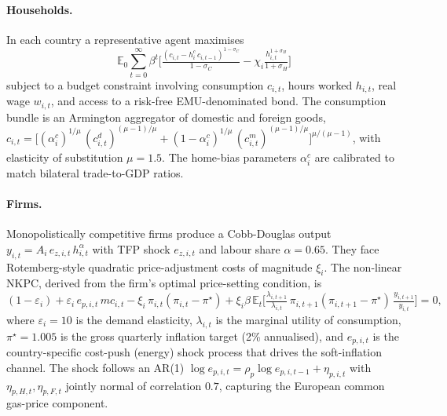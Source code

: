 \documentclass[11pt,a4paper]{article}
\begin{document}
\paragraph{Households.}
In each country a representative agent maximises
\begin{equation}
\mathbb{E}_0 \sum_{t=0}^{\infty} \beta^t
\Big[ \tfrac{(c_{i,t}-h^c_i\, c_{i,t-1})^{1-\sigma_C}}{1-\sigma_C}
- \chi_i \tfrac{h_{i,t}^{1+\sigma_H}}{1+\sigma_H} \Big]
\label{eq:utility}
\end{equation}
subject to a budget constraint involving consumption $c_{i,t}$,
hours worked $h_{i,t}$, real wage $w_{i,t}$, and access to a
risk-free EMU-denominated bond. The consumption bundle is an
Armington aggregator of domestic and foreign goods,
$c_{i,t} = \big[ (\alpha^c_i)^{1/\mu}\, (c^d_{i,t})^{(\mu-1)/\mu} +
(1-\alpha^c_i)^{1/\mu}\, (c^m_{i,t})^{(\mu-1)/\mu} \big]^{\mu/(\mu-1)}$,
with elasticity of substitution $\mu = 1.5$. The home-bias parameters
$\alpha^c_i$ are calibrated to match bilateral trade-to-GDP ratios.

\paragraph{Firms.}
Monopolistically competitive firms produce a Cobb-Douglas output
$y_{i,t} = A_i\, e_{z,i,t}\, h_{i,t}^{\alpha}$ with TFP shock
$e_{z,i,t}$ and labour share $\alpha = 0.65$. They face Rotemberg-style
\citep{Rotemberg1982} quadratic price-adjustment costs of magnitude
$\xi_i$. The non-linear NKPC, derived from the firm's optimal
price-setting condition, is
\begin{equation}
(1-\varepsilon_i) + \varepsilon_i\, e_{p,i,t}\,mc_{i,t}
- \xi_i\, \pi_{i,t}(\pi_{i,t} - \pi^{\star})
+ \xi_i \beta\,\mathbb{E}_t\!\Big[\tfrac{\lambda_{i,t+1}}{\lambda_{i,t}}\,
\pi_{i,t+1}(\pi_{i,t+1}-\pi^{\star})\,\tfrac{y_{i,t+1}}{y_{i,t}}\Big] = 0,
\label{eq:nkpc}
\end{equation}
where $\varepsilon_i = 10$ is the demand elasticity, $\lambda_{i,t}$
is the marginal utility of consumption, $\pi^{\star}=1.005$ is the
gross quarterly inflation target (2\% annualised), and $e_{p,i,t}$
is the country-specific cost-push (energy) shock process that drives
the soft-inflation channel. The shock follows an AR(1)
$\log e_{p,i,t} = \rho_p \log e_{p,i,t-1} + \eta_{p,i,t}$ with
$\eta_{p,H,t}, \eta_{p,F,t}$ jointly normal of correlation $0.7$,
capturing the European common gas-price component.
\end{document}
